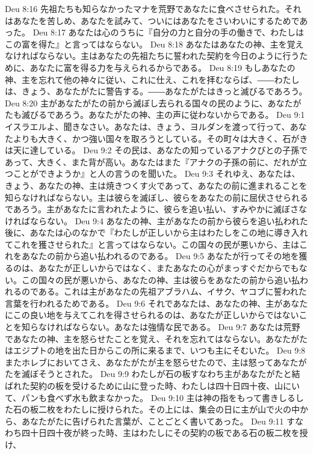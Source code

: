 Deu 8:16  先祖たちも知らなかったマナを荒野であなたに食べさせられた。それはあなたを苦しめ、あなたを試みて、ついにはあなたをさいわいにするためであった。
Deu 8:17  あなたは心のうちに『自分の力と自分の手の働きで、わたしはこの富を得た』と言ってはならない。
Deu 8:18  あなたはあなたの神、主を覚えなければならない。主はあなたの先祖たちに誓われた契約を今日のように行うために、あなたに富を得る力を与えられるからである。
Deu 8:19  もしあなたの神、主を忘れて他の神々に従い、これに仕え、これを拝むならば、――わたしは、きょう、あなたがたに警告する。――あなたがたはきっと滅びるであろう。
Deu 8:20  主があなたがたの前から滅ぼし去られる国々の民のように、あなたがたも滅びるであろう。あなたがたの神、主の声に従わないからである。
Deu 9:1  イスラエルよ、聞きなさい。あなたは、きょう、ヨルダンを渡って行って、あなたよりも大きく、かつ強い国々を取ろうとしている。その町々は大きく、石がきは天に達している。
Deu 9:2  その民は、あなたの知っているアナクびとの子孫であって、大きく、また背が高い。あなたはまた『アナクの子孫の前に、だれが立つことができようか』と人の言うのを聞いた。
Deu 9:3  それゆえ、あなたは、きょう、あなたの神、主は焼きつくす火であって、あなたの前に進まれることを知らなければならない。主は彼らを滅ぼし、彼らをあなたの前に屈伏させられるであろう。主があなたに言われたように、彼らを追い払い、すみやかに滅ぼさなければならない。
Deu 9:4  あなたの神、主があなたの前から彼らを追い払われた後に、あなたは心のなかで『わたしが正しいから主はわたしをこの地に導き入れてこれを獲させられた』と言ってはならない。この国々の民が悪いから、主はこれをあなたの前から追い払われるのである。
Deu 9:5  あなたが行ってその地を獲るのは、あなたが正しいからではなく、またあなたの心がまっすぐだからでもない。この国々の民が悪いから、あなたの神、主は彼らをあなたの前から追い払われるのである。これは主があなたの先祖アブラハム、イサク、ヤコブに誓われた言葉を行われるためである。
Deu 9:6  それであなたは、あなたの神、主があなたにこの良い地を与えてこれを得させられるのは、あなたが正しいからではないことを知らなければならない。あなたは強情な民である。
Deu 9:7  あなたは荒野であなたの神、主を怒らせたことを覚え、それを忘れてはならない。あなたがたはエジプトの地を出た日からこの所に来るまで、いつも主にそむいた。
Deu 9:8  またホレブにおいてさえ、あなたがたが主を怒らせたので、主は怒ってあなたがたを滅ぼそうとされた。
Deu 9:9  わたしが石の板すなわち主があなたがたと結ばれた契約の板を受けるために山に登った時、わたしは四十日四十夜、山にいて、パンも食べず水も飲まなかった。
Deu 9:10  主は神の指をもって書きしるした石の板二枚をわたしに授けられた。その上には、集会の日に主が山で火の中から、あなたがたに告げられた言葉が、ことごとく書いてあった。
Deu 9:11  すなわち四十日四十夜が終った時、主はわたしにその契約の板である石の板二枚を授け、
